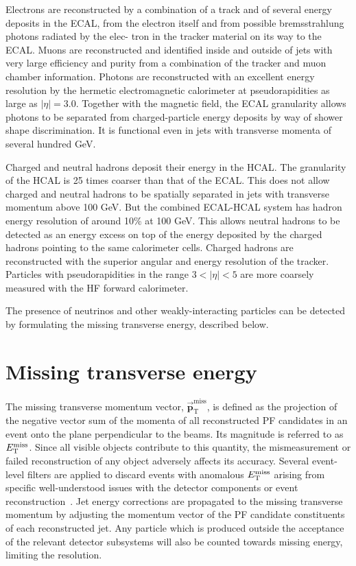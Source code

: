 Electrons are reconstructed by a combination of a track and of several energy deposits in the
ECAL, from the electron itself and from possible bremsstrahlung photons radiated by the elec-
tron in the tracker material on its way to the ECAL.
Muons are reconstructed and identified inside and outside of jets with very large efficiency and
purity from a combination of the tracker and muon chamber information.
Photons are reconstructed with an excellent energy resolution by the hermetic electromagnetic
calorimeter at pseudorapidities as large as $|\eta|=3.0$.
Together with the magnetic field, the ECAL granularity allows photons to be separated from charged-particle energy deposits by way of shower shape discrimination.
It is functional even in jets with transverse momenta of several hundred GeV.

Charged and neutral hadrons deposit their energy in the HCAL.
The granularity of the HCAL is 25 times coarser than that of the ECAL.
This does not allow charged and neutral hadrons to be spatially separated in
jets with transverse momentum above 100 GeV.
But the combined ECAL-HCAL system has hadron energy resolution of around 10\% at 100 GeV.
This allows neutral hadrons to be detected as an energy excess on top of the energy deposited
by the charged hadrons pointing to the same calorimeter cells. 
Charged hadrons are reconstructed with the superior angular and energy resolution of the tracker.
Particles with pseudorapidities in the range $3<|\eta|<5$ are more coarsely measured with the HF forward calorimeter.

The presence of neutrinos and other weakly-interacting particles can be detected by formulating
the missing transverse energy, described below.

\section{Missing transverse energy}
The missing transverse momentum vector, $\vec{\mathbf{p}}_\mathrm{T}^\mathrm{miss}$, is defined as the projection
of the negative vector sum of the momenta of all reconstructed PF candidates in an event
onto the plane perpendicular to the beams.
Its magnitude is referred to as $E_\mathrm{T}^{\mathrm{miss}}$.
Since all visible objects contribute to this quantity, the mismeasurement or failed reconstruction
of any object adversely affects its accuracy.
Several event-level filters are applied to discard events with anomalous $E_\mathrm{T}^{\mathrm{miss}}$ arising from specific well-understood issues with the detector components or event reconstruction~\cite{CMS-PAS-JME-16-004}.
Jet energy corrections are propagated to the missing transverse momentum by
adjusting the momentum vector of the PF candidate constituents of each reconstructed jet.
Any particle which is produced outside the acceptance of the relevant detector subsystems will also be counted towards missing energy, limiting the resolution.


